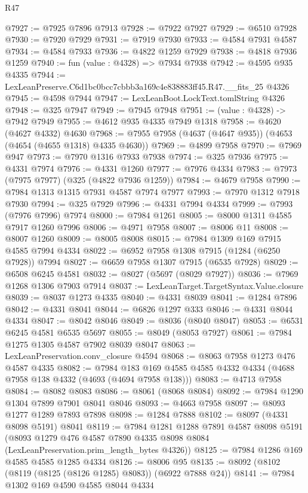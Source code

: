 \begin{lexlean}{R47}
\begin{coremodule}
@7927 := @7925 @7896 @7913
@7928 := @7922 @7927
@7929 := @6510 @7928
@7930 := @7920 @7929
@7931 := @7919 @7930
@7933 := @4584 @7931 @4587
@7934 := @4584 @7933
@7936 := @4822 @1259 @7929
@7938 := @4818 @7936 @1259
@7940 := fun (value : @4328) => @7934 @7938
@7942 := @4595 @935 @4335
@7944 := LexLeanPreserve.C6d1bc0bcc7cbbb3a169c4e838883ff45.R47.__fits_25 @4326
@7945 := @4598 @7944
@7947 := LexLeanBoot.LockText.tomlString @4326
@7948 := @325 @7947
@7949 := @7945 @7948
@7951 := (value : @4328) -> @7942 @7949
@7955 := @4612 @935 @4335 @7949 @1318
@7958 := @4620 (@4627 @4332) @4630
@7968 := @7955 @7958 (@4637 (@4647 @935)) (@4653 (@4654 (@4655 @1318) @4335 @4630))
@7969 := @4899 @7958
@7970 := @7969 @947
@7973 := @7970 @1316 @7933 @7938
@7974 := @325 @7936
@7975 := @4331 @7974
@7976 := @4331 @1260
@7977 := @7976 @4334
@7983 := @7973 (@7975 @7977) (@325 (@4822 @7936 @1259))
@7984 := @4679 @7958
@7990 := @7984 @1313 @1315 @7931 @4587 @7974 @7977
@7993 := @7970 @1312 @7918 @7930
@7994 := @325 @7929
@7996 := @4331 @7994 @4334
@7999 := @7993 (@7976 @7996) @7974
@8000 := @7984 @1261
@8005 := @8000 @1311 @4585 @7917 @1260 @7996
@8006 := @4971 @7958
@8007 := @8006 @11
@8008 := @8007 @1260
@8009 := @8005 @8008
@8015 := @7984 @1309 @169 @7915 @4585 @7994 @4334
@8022 := @6952 @7958 @1308 @7915 (@1284 (@6250 @7928)) @7994
@8027 := @6659 @7958 @1307 @7915 (@6535 @7928)
@8029 := @6508 @6245 @4581
@8032 := @8027 (@5697 (@8029 @7927))
@8036 := @7969 @1268 @1306 @7903 @7914
@8037 := LexLeanTarget.TargetSyntax.Value.closure
@8039 := @8037 @1273 @4335
@8040 := @4331 @8039
@8041 := @1284 @7896
@8042 := @4331 @8041
@8044 := @6826 @1297 @333
@8046 := @4331 @8044 @4334
@8047 := @8042 @8046
@8049 := @8036 (@8040 @8047)
@8053 := @6531 @6245 @4581 @6535 @5697
@8055 := @8049 (@8053 @7927)
@8061 := @7984 @1275 @1305 @4587 @7902 @8039 @8047
@8063 := LexLeanPreservation.conv_closure @4594
@8068 := @8063 @7958 @1273 @476 @4587 @4335
@8082 := @7984 @183 @169 @4585 @4585 @4332 @4334 (@4688 @7958 @138 @4332 (@4693 (@4694 @7958 @138)))
@8083 := @4713 @7958
@8084 := @8082 @8083
@8086 := @8061 (@8068 @8084)
@8092 := @7984 @1290 @1304 @7899 @7901 @8041 @8046
@8093 := @4663 @7958
@8097 := @8093 @1277 @1289 @7893 @7898
@8098 := @1284 @7888
@8102 := @8097 (@4331 @8098 @5191) @8041
@8119 := @7984
    @1281
    @1288
    @7891
    @4587
    @8098
    @5191
    (@8093 @1279 @476 @4587 @7890 @4335 @8098 @8084 (LexLeanPreservation.prim_length_bytes @4326))
@8125 := @7984 @1286 @169 @4585 @4585 @1285 @4334
@8126 := @8006 @95
@8135 := @8092 (@8102 (@8119 (@8125 (@8126 @1285) @8083)) (@6922 @7888 @24))
@8141 := @7984 @1302 @169 @4590 @4585 @8044 @4334

\end{coremodule}
\end{lexlean}
